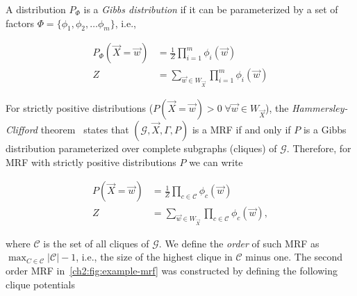 A distribution $P_{\Phi}$ is a \emph{Gibbs distribution} if it can be parameterized by a set of factors $\Phi = \{\phi_1,\phi_2,\dots \phi_m\}$, i.e., 

\begin{align*}
	P_{\Phi}(\vec{X} = \vec{w}) &= \frac{1}{Z}\prod_{i=1}^{m}{\phi_i(\vec{w})} \\
	Z &= \sum_{\vec{w} \in W_{\vec{X}}}{ \prod_{i=1}^{m}{\phi_i(\vec{w})} }
\end{align*}


For strictly positive distributions ($P(\vec{X} = \vec{w}) > 0\; \forall \vec{w} \in W_{\vec{X}}$), the \emph{Hammersley-Clifford} theorem~\cite{koller09} states that $(\mathcal{G},\vec{X},\Gamma,P)$ is a MRF if and only if $P$ is a Gibbs distribution parameterized over complete subgraphs (cliques) of $\mathcal{G}$. Therefore, for MRF with strictly positive distributions $P$ we can write 

\begin{align}
	P(\vec{X} = \vec{w}) &= \frac{1}{Z}\prod_{c \in \mathcal{C}}{\phi_c(\vec{w})} \label{ch2:eq:gibbs-distribution}\\
	Z &=  \sum_{\vec{w} \in W_{\vec{X}}}{ \prod_{c \in \mathcal{C}}{\phi_c(\vec{w})} },\label{ch2:eq:gibbs-constant}
\end{align}

where $\mathcal{C}$ is the set of all cliques of $\mathcal{G}$. We define the \emph{order} of such MRF as $\max_{C \in \mathcal{C}} |\mathcal{C}|-1$, i.e., the size of the highest clique in $\mathcal{C}$ minus one. The second order MRF in~\cref{ch2:fig:example-mrf} was constructed by defining the following clique potentials

